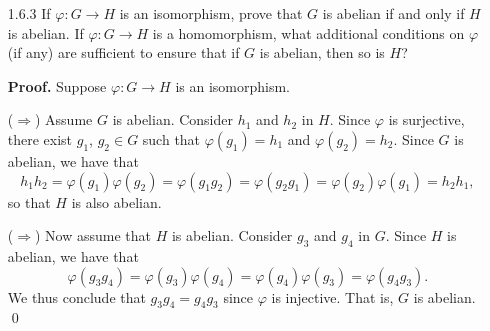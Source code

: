 \begin{enumerate}
      \textbf{Proof.} Assume that $\varphi : G \rightarrow H$ is a group
      isomorphism. Let $x \in G$. Suppose $|x| = n$. By the preceding exercise, 
      we have that $\varphi(x)^n = \varphi(x^n) = \varphi(1) = 1$, so that
      $|\varphi(x)| \le n$. Now suppose that $|\varphi(x)| = m < n$. Then we
      must have that $\varphi(1) = 1 = \varphi(x)^m = \varphi(x^m)$. That is,
      $x^m = 1$ (since $\varphi$ is injective), a contradiction since $|x| = n$.
      Thus $|\varphi(x)| = |x| = n$. Finally suppose that $|x| = \infty$ and
      $|\varphi(x)| = r < \infty$. Then, as previously argued, we must have
      that $x^r = 1$, a contradiction. Thus if $y \in G$, it must follow that
      $|y| = |\varphi(y)|$. \qed

      For a positive integer $n$, we can now exhibit a bijection (using
      $\varphi$) between the elements of $G$ of order $n$ and the elements of
      $H$ of order $n$. Thus any two isomorphic groups must have the same number 
      of elements of order $n$ for each $n \in \Z^+$. If $\varphi$ is only 
      assumed to be a homomorphism then the result is not generally true. 
      Consider the homomorphism
      $$\alpha : S_3 \rightarrow \{1\}.$$
      Although $S_3$ has an element of order 2, the trivial group $\{1\}$ has no 
      element of order 2.
   \item[1.6.3]   If $\varphi : G \rightarrow H$ is an isomorphism, prove that
                  $G$ is abelian if and only if $H$ is abelian. If
                  $\varphi : G \rightarrow H$ is a homomorphism, what additional
                  conditions on $\varphi$ (if any) are sufficient to ensure that
                  if $G$ is abelian, then so is $H$?

      \textbf{Proof.} Suppose $\varphi : G \rightarrow H$ is an isomorphism.

      ($\Rightarrow$) Assume $G$ is abelian. Consider $h_1$ and $h_2$ in $H$.
      Since $\varphi$ is surjective, there exist $g_1$, $g_2 \in G$ such that
      $\varphi(g_1) = h_1$ and $\varphi(g_2) = h_2$. Since $G$ is abelian, we
      have that
      $$h_1h_2 = \varphi(g_1)\varphi(g_2) = \varphi(g_1g_2) = \varphi(g_2g_1) = 
        \varphi(g_2)\varphi(g_1) = h_2h_1,$$
      so that $H$ is also abelian.

      ($\Rightarrow$) Now assume that $H$ is abelian. Consider $g_3$ and $g_4$ 
      in $G$. Since $H$ is abelian, we have that
      $$\varphi(g_3g_4) = \varphi(g_3)\varphi(g_4) = \varphi(g_4)\varphi(g_3) =
        \varphi(g_4g_3).$$
      We thus conclude that $g_3g_4 = g_4g_3$ since $\varphi$ is injective. That
      is, $G$ is abelian. \qed


\end{enumerate}
